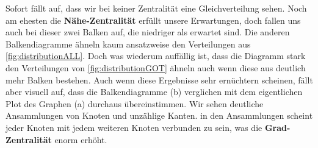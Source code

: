 Sofort fällt auf, dass wir bei keiner Zentralität eine Gleichverteilung sehen. Noch am ehesten die \textbf{Nähe-Zentralität} erfüllt unsere Erwartungen, doch fallen uns auch bei dieser zwei Balken auf, die niedriger als erwartet sind. Die anderen Balkendiagramme ähneln kaum ansatzweise den Verteilungen aus \ref{fig:distributionALL}. Doch was wiederum auffällig ist, dass die Diagramm stark den Verteilungen von \ref{fig:distributionGOT} ähneln auch wenn diese aus deutlich mehr Balken bestehen. Auch wenn diese Ergebnisse sehr ernüchtern scheinen, fällt aber visuell auf, dass die Balkendiagramme (b) verglichen mit dem eigentlichen Plot des Graphen (a) durchaus übereinstimmen. Wir sehen deutliche Ansammlungen von Knoten und unzählige Kanten. in den Ansammlungen scheint jeder Knoten mit jedem weiteren Knoten verbunden zu sein, was die \textbf{Grad-Zentralität} enorm erhöht.

